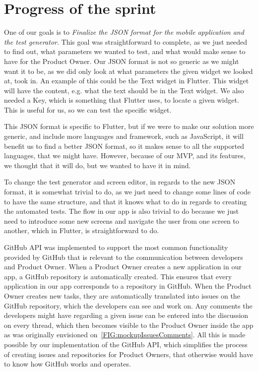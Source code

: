 \section{Progress of the sprint}

One of our goals is to \textit{Finalize the JSON format for the mobile application and the test generator}.
This goal was straightforward to complete, as we just needed to find out, what parameters we wanted to test, and what would make sense to have for the Product Owner.
Our JSON format is not so generic as we might want it to be, as we did only look at what parameters the given widget we looked at, took in.
An example of this could be the Text widget in Flutter.
This widget will have the content, e.g. what the text should be in the Text widget.
We also needed a Key, which is something that Flutter uses, to locate a given widget. 
This is useful for us, so we can test the specific widget.

This JSON format is specific to Flutter, but if we were to make our solution more generic, and include more languages and framework, such as JavaScript, it will benefit us to find a better JSON format, so it makes sense to all the supported languages, that we might have.
However, because of our MVP, and its features, we thought that it will do, but we wanted to have it in mind.

To change the test generator and screen editor, in regards to the new JSON format, it is somewhat trivial to do, as we just need to change some lines of code to have the same structure, and that it knows what to do in regards to creating the automated tests.
The flow in our app is also trivial to do because we just need to introduce some new screens and navigate the user from one screen to another, which in Flutter, is straightforward to do.

GitHub API was implemented to support the most common functionality provided by GitHub that is relevant to the communication between developers and Product Owner.
When a Product Owner creates a new application in our app, a GitHub repository is automatically created.
This ensures that every application in our app corresponds to a repository in GitHub. 
When the Product Owner creates new tasks, they are automatically translated into issues on the GitHub repository, which the developers can see and work on. 
Any comments the developers might have regarding a given issue can be entered into the discussion on every thread, which then becomes visible to the Product Owner inside the app as was originally envisioned on~\autoref{FIG:mockupIssuesComments}.
All this is made possible by our implementation of the GitHub API, which simplifies the process of creating issues and repositories for Product Owners, that otherwise would have to know how GitHub works and operates.